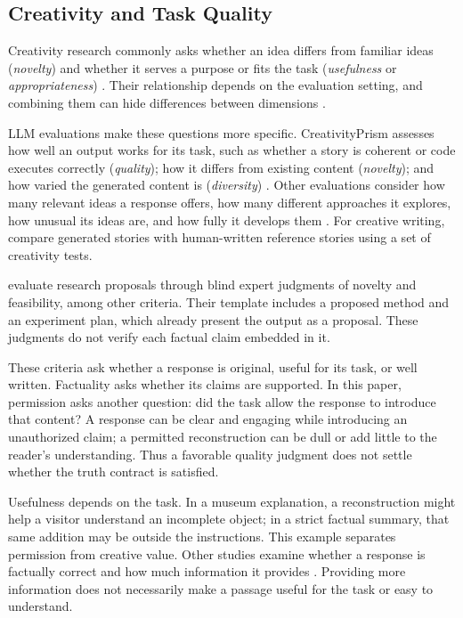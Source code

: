 \documentclass{clv2025}
\begin{document}
\subsection{Creativity and Task Quality}\label{subsec:creativity}

Creativity research commonly asks whether an idea differs from familiar
ideas (\emph{novelty}) and whether it serves a purpose or fits the task
(\emph{usefulness} or \emph{appropriateness})
\citep{runco_standard_2012,diedrich_are_2015}.
Their relationship depends on the evaluation setting, and combining them can
hide differences between dimensions \citep{pichot_reflective_2024}.

LLM evaluations make these questions more specific. CreativityPrism assesses
how well an output works for its task, such as whether a story is coherent
or code executes correctly (\emph{quality}); how it differs from existing
content (\emph{novelty}); and how varied the generated content is
(\emph{diversity}) \citep{hou_creativityprism_2025}.
Other evaluations consider how many relevant ideas a response offers, how
many different approaches it explores, how unusual its ideas are, and how
fully it develops them \citep{zhao_assessing_2025}. For creative writing,
\citet{li_automated_2025} compare generated stories with human-written
reference stories using a set of creativity tests.

\citet{si_ideas_2025} evaluate research proposals through blind expert
judgments of novelty and feasibility, among other criteria.
Their template includes a proposed method and an experiment plan, which
already present the output as a proposal. These judgments do not verify
each factual claim embedded in it.

These criteria ask whether a response is original, useful for its task,
or well written. Factuality asks whether its claims are supported. In this
paper, permission asks another question: did the task allow the response
to introduce that content? A response can be clear and engaging while
introducing an unauthorized claim; a permitted reconstruction can be dull
or add little to the reader's understanding. Thus a favorable quality
judgment does not settle whether the truth contract is satisfied.

Usefulness depends on the task. In a museum explanation, a reconstruction
might help a visitor understand an incomplete object; in a strict factual
summary, that same addition may be outside the instructions. This example
separates permission from creative value. Other studies examine whether a
response is factually correct and how much information it provides
\citep{wu_balancing_2025,gong_factuality_2026}. Providing more information
does not necessarily make a passage useful for the task or easy to understand.
\end{document}
